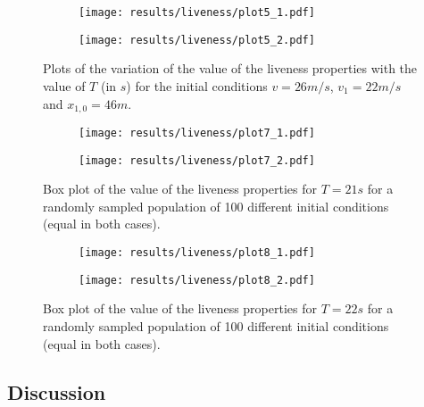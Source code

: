 \begin{figure}[H]
\centering
\begin{subfigure}{0.49\textwidth}
  \centering
  \texttt{[image: results/liveness/plot5\_1.pdf]}
\end{subfigure}
\begin{subfigure}{0.49\textwidth}
  \centering
  \texttt{[image: results/liveness/plot5\_2.pdf]}
\end{subfigure} 
\caption{Plots of the variation of the value of the liveness properties with the value of $T$ (in $s$) for the initial conditions $v = 26m/s$, $v_1 = 22m/s$ and $x_{1,0} = 46m$.}
\label{fig:plot5}
\end{figure}

\begin{figure}[H]
\centering
\begin{subfigure}{0.49\textwidth}
  \centering
  \texttt{[image: results/liveness/plot7\_1.pdf]}
\end{subfigure}
\begin{subfigure}{0.49\textwidth}
  \centering
  \texttt{[image: results/liveness/plot7\_2.pdf]}
\end{subfigure} 
\caption{Box plot of the value of the liveness properties for $T = 21s$ for a randomly sampled population of 100 different initial conditions (equal in both cases).}
\label{fig:plot7}
\end{figure}

\begin{figure}[H]
\centering
\begin{subfigure}{0.49\textwidth}
  \centering
  \texttt{[image: results/liveness/plot8\_1.pdf]}
\end{subfigure}
\begin{subfigure}{0.49\textwidth}
  \centering
  \texttt{[image: results/liveness/plot8\_2.pdf]}
\end{subfigure} 
\caption{Box plot of the value of the liveness properties for $T = 22s$ for a randomly sampled population of 100 different initial conditions (equal in both cases).}
\label{fig:plot8}
\end{figure}

\subsection{Discussion}


